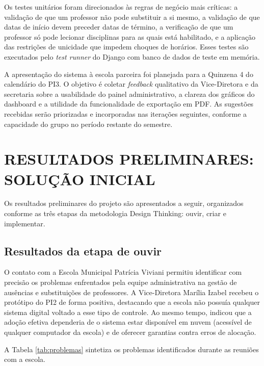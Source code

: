 Os testes unitários foram direcionados às regras de negócio mais críticas: a validação de que um professor não pode substituir a si mesmo, a validação de que datas de início devem preceder datas de término, a verificação de que um professor só pode lecionar disciplinas para as quais está habilitado, e a aplicação das restrições de unicidade que impedem choques de horários. Esses testes são executados pelo \textit{test runner} do Django com banco de dados de teste em memória.

A apresentação do sistema à escola parceira foi planejada para a Quinzena 4 do calendário do PI3. O objetivo é coletar \textit{feedback} qualitativo da Vice-Diretora e da secretaria sobre a usabilidade do painel administrativo, a clareza dos gráficos do dashboard e a utilidade da funcionalidade de exportação em PDF. As sugestões recebidas serão priorizadas e incorporadas nas iterações seguintes, conforme a capacidade do grupo no período restante do semestre.


\section[Resultados preliminares: solução inicial]{RESULTADOS PRELIMINARES: SOLUÇÃO INICIAL}

Os resultados preliminares do projeto são apresentados a seguir, organizados conforme as três etapas da metodologia Design Thinking: ouvir, criar e implementar.

\subsection{Resultados da etapa de ouvir}

O contato com a Escola Municipal Patrícia Viviani permitiu identificar com precisão os problemas enfrentados pela equipe administrativa na gestão de ausências e substituições de professores. A Vice-Diretora Marília Izabel recebeu o protótipo do PI2 de forma positiva, destacando que a escola não possuía qualquer sistema digital voltado a esse tipo de controle. Ao mesmo tempo, indicou que a adoção efetiva dependeria de o sistema estar disponível em nuvem (acessível de qualquer computador da escola) e de oferecer garantias contra erros de alocação.

A Tabela \ref{tab:problemas} sintetiza os problemas identificados durante as reuniões com a escola.

